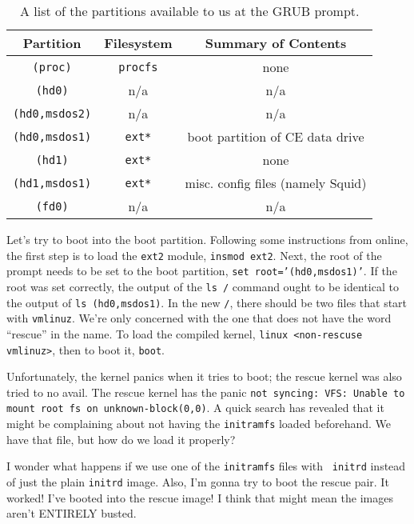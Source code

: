 \documentclass[12pt]{article}
\begin{document}
\begin{table}[H]
  \label{tab:grubPartitions}
  \caption{A list of the partitions available to us at the GRUB prompt.}
  \begin{center}
    \begin{tabular}{|c|c|c|}
      \hline
      Partition & Filesystem & Summary of Contents \\
      \hline
      {\tt (proc)} & {\tt procfs} & none \\
      {\tt (hd0)} & n/a & n/a \\
      {\tt (hd0,msdos2)} & n/a & n/a \\
      {\tt (hd0,msdos1)} & {\tt ext*} & boot partition of CE data drive \\
      {\tt (hd1)} & {\tt ext*} & none \\
      {\tt (hd1,msdos1)} & {\tt ext*} & misc. config files (namely Squid) \\
      {\tt (fd0)} & n/a & n/a \\
      \hline
    \end{tabular}
  \end{center}
\end{table}

\qq Let's try to boot into the boot partition. Following some instructions from
online, the first step is to load the {\tt ext2} module, {\tt insmod
  ext2}. Next, the root of the prompt needs to be set to the boot partition,
{\tt set root='(hd0,msdos1)'}. If the root was set correctly, the output of the
{\tt ls /} command ought to be identical to the output of {\tt ls
  (hd0,msdos1)}. In the new {\tt /}, there should be two files that start with
{\tt vmlinuz}. We're only concerned with the one that does not have the word
``rescue'' in the name. To load the compiled kernel, {\tt linux <non-rescuse
  vmlinuz>}, then to boot it, {\tt boot}.

\qq Unfortunately, the kernel panics when it tries to boot; the rescue
kernel was also tried to no avail. The rescue kernel has the panic {\tt not
syncing: VFS: Unable to mount root fs on unknown-block(0,0)}. A quick search has
revealed that it might be complaining about not having the {\tt initramfs}
loaded beforehand. We have that file, but how do we load it properly?

\qq I wonder what happens if we use one of the {\tt initramfs} files with {\tt
  initrd} instead of just the plain {\tt initrd} image. Also, I'm gonna try to
boot the rescue pair. It worked! I've booted into the rescue image! I think that
might mean the images aren't ENTIRELY busted. 
\end{document}
